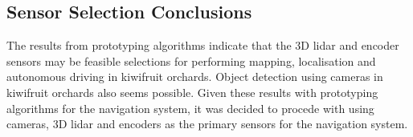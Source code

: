 \documentclass[preprint,authoryear,12pt]{elsarticle}
\begin{document}


    

\subsection{Sensor Selection Conclusions}
    The results from prototyping algorithms indicate that the 3D lidar and encoder sensors may be feasible selections for performing mapping, localisation and autonomous driving in kiwifruit orchards. Object detection using cameras in kiwifruit orchards also seems possible. Given these results with prototyping algorithms for the navigation system, it was decided to procede with using cameras, 3D lidar and encoders as the primary sensors for the navigation system.   
\end{document}
